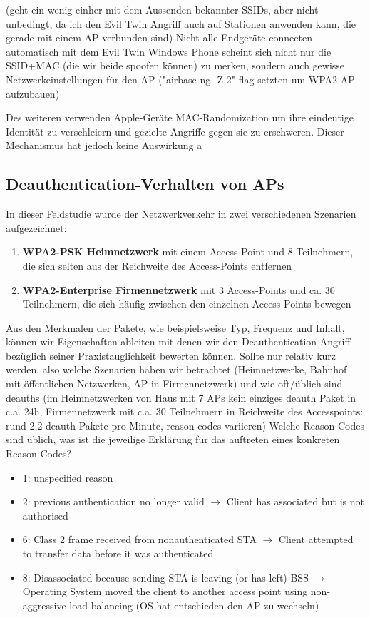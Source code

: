 (geht ein wenig einher mit dem Aussenden bekannter SSIDs, aber nicht unbedingt, da ich den Evil Twin Angriff auch auf Stationen anwenden kann, die gerade mit einem AP verbunden sind)
Nicht alle Endgeräte connecten automatisch mit dem Evil Twin
Windows Phone scheint sich nicht nur die SSID+MAC (die wir beide spoofen können) zu merken, sondern auch gewisse Netzwerkeinstellungen für den AP ("airbase-ng -Z 2" flag setzten um WPA2 AP aufzubauen)

Des weiteren verwenden Apple-Geräte MAC-Randomization um ihre eindeutige Identität zu verschleiern und gezielte Angriffe gegen sie zu erschweren.
Dieser Mechanismus hat jedoch keine Auswirkung a

\subsection{Deauthentication-Verhalten von APs}
In dieser Feldstudie wurde der Netzwerkverkehr in zwei verschiedenen Szenarien aufgezeichnet:
\begin{enumerate}
	\item \textbf{WPA2-PSK Heimnetzwerk} mit einem Access-Point und 8 Teilnehmern, die sich selten aus der Reichweite des Access-Points entfernen
	\item \textbf{WPA2-Enterprise Firmennetzwerk} mit 3 Access-Points und ca. 30 Teilnehmern, die sich häufig zwischen den einzelnen Access-Points bewegen
\end{enumerate}
Aus den Merkmalen der Pakete, wie beispielsweise Typ, Frequenz und Inhalt, können wir Eigenschaften ableiten mit denen wir den Deauthentication-Angriff bezüglich seiner Praxistauglichkeit bewerten können.
Sollte nur relativ kurz werden, also welche Szenarien haben wir betrachtet (Heimnetzwerke, Bahnhof mit öffentlichen Netzwerken, AP in Firmennetzwerk) und wie oft/üblich sind deauths (im Heimnetzwerken von Haus mit 7 APs kein einziges deauth Paket in c.a. 24h, Firmennetzwerk mit c.a. 30 Teilnehmern in Reichweite des Accesspoints: rund 2,2 deauth Pakete pro Minute, reason codes variieren)
Welche Reason Codes sind üblich, was ist die jeweilige Erklärung für das auftreten eines konkreten Reason Codes?
\begin{itemize}
	\item 1: unspecified reason 
    \item 2: previous authentication no longer valid $\rightarrow$ Client has associated but is not authorised
    \item 6: Class 2 frame received from nonauthenticated STA $\rightarrow$ Client attempted to transfer data before it was authenticated
   	\item 8: Disassociated because sending STA is leaving (or has left) BSS $\rightarrow$ Operating System moved the client to another access point using non-aggressive load balancing (OS hat entschieden den AP zu wechseln)  
\end{itemize}